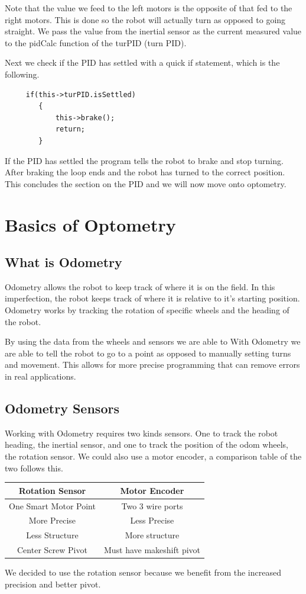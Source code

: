 \documentclass[12pt]{article}
\begin{document}
    Note that the value we feed to the left motors is the opposite of that fed to the right motors. This is done so the robot will actually turn as opposed to going straight. We pass the value from the inertial sensor as the current measured value to the pidCalc function of the turPID (turn PID).

    Next we check if the PID has settled with a quick if statement, which is the following.
    \begin{verbatim}
     if(this->turPID.isSettled)
        {
            this->brake();
            return;
        }
    \end{verbatim}

    If the PID has settled the program tells the robot to brake and stop turning. After braking the loop ends and the robot has turned to the correct position. This concludes the section on the PID and we will now move onto optometry.


\pagebreak
\section{Basics of Optometry}
\subsection{What is Odometry}
    Odometry allows the robot to keep track of where it is on the field. In this imperfection, the robot keeps track of where it is relative to it's starting position. Odometry works by tracking the rotation of specific wheels and the heading of the robot.

    By using the data from the wheels and sensors we are able to
    With Odometry we are able to tell the robot to go to a point as opposed to manually setting turns and movement. This allows for more precise programming that can remove errors in real applications.

\subsection{Odometry Sensors}
    Working with Odometry requires two kinds sensors. One to track the robot heading, the inertial sensor, and one to track the position of the odom wheels, the rotation sensor. We could also use a motor encoder, a comparison table of the two follows this.
    \begin{center}
        \begin{tabular}{c|c}
            Rotation Sensor & Motor Encoder \\
            \hline
            One Smart Motor Point & Two 3 wire ports \\
            More Precise & Less Precise \\
            Less Structure & More structure \\
            Center Screw Pivot & Must have makeshift pivot \\
        \end{tabular}

        We decided to use the rotation sensor because we benefit from the increased precision and better pivot.
    \end{center}
\end{document}
